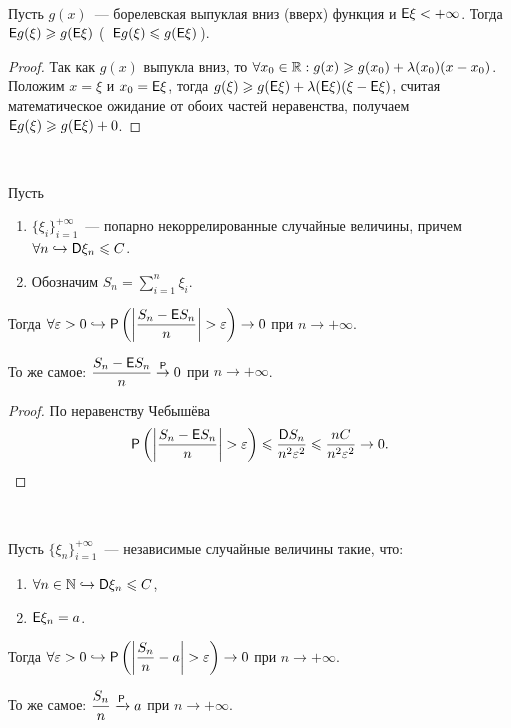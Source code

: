 \begin{lemma}~

	Пусть $g(x)$~--- борелевская выпуклая вниз (вверх) функция и $\E \xi < +\infty$. 
	Тогда $\E g(\xi) \geqslant g(\E \xi )$ (~$\E g(\xi) \leqslant g(\E \xi )$\,).
	\begin{proof}
		Так как $g(x)$ выпукла вниз, то $\forall x_0 \in \R : g(x) \geqslant g(x_0) + \lambda(x_0)(x - x_0)$. Положим $x = \xi$ и $x_0 = \E \xi$, тогда $g(\xi) \geqslant g(\E \xi) + \lambda(\E \xi)(\xi - \E \xi)$, считая математическое ожидание от обоих частей неравенства, получаем $\E g(\xi) \geqslant g( \E \xi ) + 0$.
	\end{proof}
\end{lemma}


\begin{theorem}~

	Пусть 
	\begin{enumerate}
	    \item $\{\xi_i\}_{i=1}^{+\infty}$~---  попарно некоррелированные случайные величины, причем $\forall n \hookrightarrow \D \xi_n \leqslant C$.
	    \item Обозначим $S_n = \sum\limits_{i=1}^n \xi_i$.
	\end{enumerate} 
	Тогда $\forall \varepsilon > 0 \hookrightarrow \P \left(\left| \dfrac{S_n - \E S_n}{n} \right| > \varepsilon\right) \rightarrow 0$ при $n \rightarrow +\infty$.
	
	То же самое: $\dfrac{S_n - \E S_n}{n} \overset{\P}{\rightarrow} 0$ при $n \rightarrow +\infty$\Big.
	\begin{proof}
		По неравенству Чебышёва 
		$$\P \left(\left| \dfrac{S_n - \E S_n}{n} \right| > \varepsilon\right) \leqslant \dfrac{\D S_n}{n^2 \varepsilon^2} \leqslant \dfrac{nC}{n^2\varepsilon^2} \rightarrow 0.$$ 
	\end{proof}
\end{theorem}

\begin{consequence}~

	Пусть $\{ \xi_n \}_{i=1}^{+\infty}$~--- независимые случайные величины такие, что:
	\begin{enumerate}
	    \item $\forall n \in \N \hookrightarrow \D \xi_n \leqslant C$,
	    \item $\E \xi_n = a$.
	\end{enumerate} 
	 Тогда $\forall \varepsilon > 0 \hookrightarrow \P \left(\left| \dfrac{S_n}{n} - a \right| > \varepsilon\right) \rightarrow 0$ при $n \rightarrow +\infty$.	
		
	То же самое: $\dfrac{S_n}{n} \xrightarrow{\P} a$ при $n \rightarrow + \infty$. 
\end{consequence}